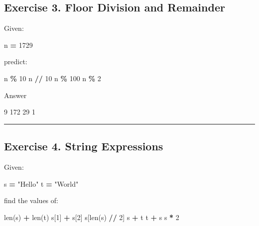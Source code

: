 \documentclass[
]{article}
\newenvironment{Shaded}{\begin{snugshade}}{\end{snugshade}}
\newcommand{\BuiltInTok}[1]{#1}
\newcommand{\DecValTok}[1]{\textcolor[rgb]{0.00,0.00,0.81}{#1}}
\newcommand{\NormalTok}[1]{#1}
\newcommand{\OperatorTok}[1]{\textcolor[rgb]{0.81,0.36,0.00}{\textbf{#1}}}
\newcommand{\StringTok}[1]{\textcolor[rgb]{0.31,0.60,0.02}{#1}}
\begin{document}
\subsection{Exercise 3. Floor Division and
Remainder}\label{exercise-3.-floor-division-and-remainder}

Given:

\begin{Shaded}
\begin{Highlighting}[]
\NormalTok{n }\OperatorTok{=} \DecValTok{1729}
\end{Highlighting}
\end{Shaded}

predict:

\begin{Shaded}
\begin{Highlighting}[]
\NormalTok{n }\OperatorTok{\%} \DecValTok{10}
\NormalTok{n }\OperatorTok{//} \DecValTok{10}
\NormalTok{n }\OperatorTok{\%} \DecValTok{100}
\NormalTok{n }\OperatorTok{\%} \DecValTok{2}
\end{Highlighting}
\end{Shaded}

Answer

\begin{Shaded}
\begin{Highlighting}[]
\NormalTok{9}
\NormalTok{172}
\NormalTok{29}
\NormalTok{1}
\end{Highlighting}
\end{Shaded}

\begin{center}\rule{0.5\linewidth}{0.5pt}\end{center}

\subsection{Exercise 4. String
Expressions}\label{exercise-4.-string-expressions}

Given:

\begin{Shaded}
\begin{Highlighting}[]
\NormalTok{s }\OperatorTok{=} \StringTok{"Hello"}
\NormalTok{t }\OperatorTok{=} \StringTok{"World"}
\end{Highlighting}
\end{Shaded}

find the values of:

\begin{Shaded}
\begin{Highlighting}[]
\BuiltInTok{len}\NormalTok{(s) }\OperatorTok{+} \BuiltInTok{len}\NormalTok{(t)}
\NormalTok{s[}\DecValTok{1}\NormalTok{] }\OperatorTok{+}\NormalTok{ s[}\DecValTok{2}\NormalTok{]}
\NormalTok{s[}\BuiltInTok{len}\NormalTok{(s) }\OperatorTok{//} \DecValTok{2}\NormalTok{]}
\NormalTok{s }\OperatorTok{+}\NormalTok{ t}
\NormalTok{t }\OperatorTok{+}\NormalTok{ s}
\NormalTok{s }\OperatorTok{*} \DecValTok{2}
\end{Highlighting}
\end{Shaded}
\end{document}
